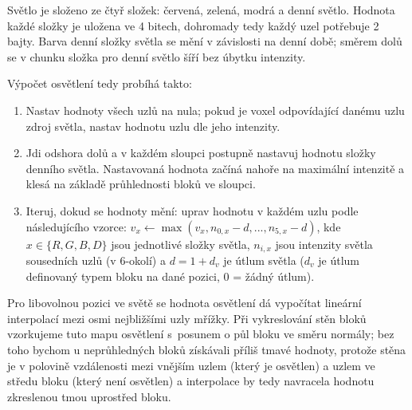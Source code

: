 Světlo je složeno ze čtyř složek: červená, zelená, modrá a denní světlo. Hodnota každé složky je uložena ve 4 bitech, dohromady tedy každý uzel potřebuje 2 bajty. Barva denní složky světla se mění v závislosti na denní době; směrem dolů se v chunku složka pro denní světlo šíří bez úbytku intenzity.

Výpočet osvětlení tedy probíhá takto: \nopagebreak
\begin{enumerate}
	\item Nastav hodnoty všech uzlů na nula; pokud je voxel odpovídající danému uzlu zdroj světla, nastav hodnotu uzlu dle jeho intenzity.
	\item Jdi odshora dolů a v každém sloupci postupně nastavuj hodnotu složky denního světla. Nastavovaná hodnota začíná nahoře na maximální intenzitě a klesá na základě průhlednosti bloků ve sloupci.
	\item Iteruj, dokud se hodnoty mění: uprav hodnotu v každém uzlu podle následujícího vzorce: $v_x \leftarrow \max(v_x, n_{0,x} - d, ..., n_{5,x} - d)$, kde $x \in \{R, G, B, D\}$ jsou jednotlivé složky světla, $n_{i, x}$ jsou intenzity světla sousedních uzlů (v 6-okolí) a $d = 1 + d_v$ je útlum světla ($d_v$ je útlum definovaný typem bloku na dané pozici, 0 = žádný útlum).
\end{enumerate}

Pro libovolnou pozici ve světě se hodnota osvětlení dá vypočítat lineární interpolací mezi osmi nejbližšími uzly mřížky. Při vykreslování stěn bloků vzorkujeme tuto mapu osvětlení s~posunem o půl bloku ve směru normály; bez toho bychom u neprůhledných bloků získávali příliš tmavé hodnoty, protože stěna je v polovině vzdálenosti mezi vnějším uzlem (který je osvětlen) a uzlem ve středu bloku (který není osvětlen) a interpolace by tedy navracela hodnotu zkreslenou tmou uprostřed bloku.

